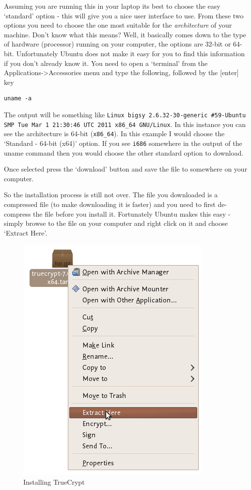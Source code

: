 Assuming you are running this in your laptop its best to choose the easy
`standard' option - this will give you a nice user interface to use.
From these two options you need to choose the one most suitable for the
\emph{architecture} of your machine. Don't know what this means? Well,
it basically comes down to the type of hardware (processor) running on
your computer, the options are 32-bit or 64-bit. Unfortunately Ubuntu
does not make it easy for you to find this information if you don't
already know it. You need to open a `terminal' from the
Applications-\textgreater{}Accessories menu and type the following,
followed by the {[}enter{]} key

\begin{verbatim}
uname -a
\end{verbatim}
The output will be something like
\verb!Linux bigsy 2.6.32-30-generic #59-Ubuntu SMP Tue Mar 1 21:30:46 UTC 2011 x86_64 GNU/Linux!.
In this instance you can see the architecture is 64-bit (\verb!x86_64!).
In this example I would choose the `Standard - 64-bit (x64)' option. If
you see \verb!i686! somewhere in the output of the uname command then
you would choose the other standard option to download.

Once selected press the `download' button and save the file to somewhere
on your computer.

So the installation process is still not over. The file you downloaded
is a compressed file (to make downloading it is faster) and you need to
first de-compress the file before you install it. Fortunately Ubuntu
makes this easy - simply browse to the file on your computer and right
click on it and choose `Extract Here'.

\begin{figure}[htbp]
\centering
\includegraphics{tc_003.png}
\caption{Installing TrueCrypt}
\end{figure}

